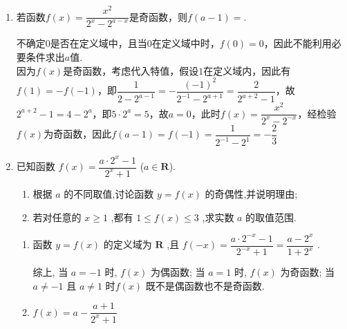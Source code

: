 \begin{enumerate}
\begin{jieda}
\begin{enumerate}
            \end{enumerate}
        \end{jieda}
        \item 若函数$f(x) = \dfrac{x^2}{2^x - 2^{a-x}}$是奇函数，则$f(a-1)=$.
        \begin{jieda}
            不确定$0$是否在定义域中，且当$0$在定义域中时，$f(0) = 0$，因此不能利用必要条件求出$a$值. \\
            因为$f(x)$是奇函数，考虑代入特值，假设$1$在定义域内，因此有$f(1) = -f(-1)$，即$\dfrac{1}{2 - 2^{a-1}} =  -\dfrac{(-1)^2}{2^{-1} - 2^{a+1}} = \dfrac{2}{2^{a+2} - 1}$，故$2^{a+2} - 1 = 4 - 2^{a}$，即$5\cdot2^a = 5$，故$a = 0$，此时$f(x) = \dfrac{x^2}{2^x - 2^{-x}}$，经检验$f(x)$为奇函数，因此$f(a-1) = f(-1) = \dfrac{1}{2^{-1} - 2^{1}} = -\dfrac{2}{3}$
        \end{jieda}
        \item 已知函数 $f\left( x\right)  = \dfrac{a \cdot  {2}^{x} - 1}{{2}^{x} + 1}$ ($a \in \mathbf{R}$).
        \begin{enumerate}
            \item 根据 $a$ 的不同取值,讨论函数 $y = f\left( x\right)$ 的奇偶性,并说明理由;
            \item 若对任意的 $x \geq  1$ ,都有 $1 \leq  f\left( x\right)  \leq  3$ ,求实数 $a$ 的取值范围.
        \end{enumerate}
        \begin{jieda}
            \begin{enumerate}
                \item 函数 $y = f\left( x\right)$ 的定义域为 $\mathbf{R}$ ,且 $f\left( {-x}\right)  = \dfrac{a \cdot  {2}^{-x} - 1}{{2}^{-x} + 1} = \dfrac{a - {2}^{x}}{1 + {2}^{x}}$ .
                综上, 当 $a =  - 1$ 时, $f\left( x\right)$ 为偶函数; 当 $a = 1$ 时, $f\left( x\right)$ 为奇函数; 当 $a \neq   - 1$ 且 $a \neq  1$ 时$f\left( x\right)$ 既不是偶函数也不是奇函数.
                \item 
                $f(x) = a - \dfrac{a+1}{2^x+1}$


\end{enumerate}
\end{jieda}
\end{enumerate}
